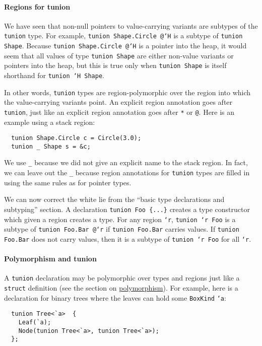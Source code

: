 \paragraph{Regions for tunion} We have seen that non-null pointers to
value-carrying variants are subtypes of the \texttt{tunion} type.  For
example, \texttt{tunion Shape.Circle @`H} is a subtype of
\texttt{tunion Shape}.  Because \texttt{tunion Shape.Circle @`H} is a
pointer into the heap, it would seem that all values of type
\texttt{tunion Shape} are either non-value variants or pointers into
the heap, but this is true only when \texttt{tunion
Shape} is itself shorthand for
\texttt{tunion `H Shape}.

In other words, \texttt{tunion} types are region-polymorphic over the region
into which the value-carrying variants point.  An explicit region
annotation goes after \texttt{tunion}, just like an explicit region annotation
goes after \texttt{*} or \texttt{@}.  Here is an example using a stack
region:
\begin{verbatim}
  tunion Shape.Circle c = Circle(3.0);
  tunion _ Shape s = &c;
\end{verbatim}

We use \texttt{_} because we did not give an explicit name to the
stack region.  In fact, we can leave out the \verb|_| because region
annotations for \texttt{tunion} types are filled in using the same
rules as for pointer types.

We can now correct the white lie from the ``basic type declarations and
subtyping'' section.  A declaration \verb|tunion Foo {...}| creates a
type constructor which given a region creates a type.  For any region
\texttt{`r}, \texttt{tunion `r Foo} is a subtype of
\texttt{tunion Foo.Bar @`r} if \texttt{tunion Foo.Bar} carries values.  If
\texttt{tunion Foo.Bar} does not carry values, then it is a subtype of
\texttt{tunion `r Foo} for all \texttt{`r}.

\paragraph{Polymorphism and tunion} A \texttt{tunion} declaration may be
polymorphic over types and regions just like a \texttt{struct}
definition (see the section on
\hyperlink{polymorphism}{polymorphism}).  For example, here is a
declaration for binary trees where the leaves can hold some
\texttt{BoxKind} \texttt{`a}:
\begin{verbatim}
  tunion Tree<`a>  {
    Leaf(`a);
    Node(tunion Tree<`a>, tunion Tree<`a>);
  };
\end{verbatim}

